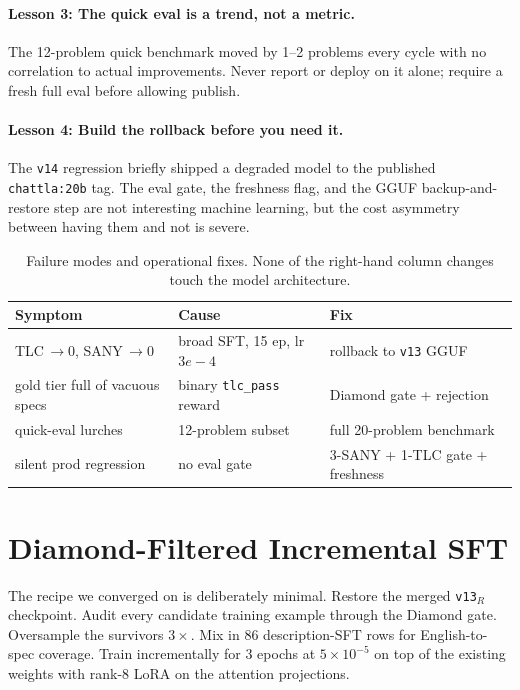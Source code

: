 \documentclass[11pt]{article}
\begin{document}
\paragraph{Lesson 3: The quick eval is a trend, not a metric.}
The 12-problem quick benchmark moved by 1--2 problems every cycle
with no correlation to actual improvements.  Never report or deploy on
it alone; require a fresh full eval before allowing publish.

\paragraph{Lesson 4: Build the rollback before you need it.}
The \texttt{v14} regression briefly shipped a degraded model to the
published \texttt{chattla:20b} tag.  The eval gate, the freshness flag,
and the GGUF backup-and-restore step are not interesting machine
learning, but the cost asymmetry between having them and not is severe.

\begin{table}[t]
\centering
\small
\begin{tabular}{@{}lll@{}}
\toprule
Symptom & Cause & Fix \\
\midrule
TLC$\,\to\!0$, SANY$\,\to\!0$ & broad SFT, 15 ep, lr $3e\!-\!4$
  & rollback to \texttt{v13} GGUF \\
gold tier full of vacuous specs & binary \texttt{tlc\_pass} reward
  & Diamond gate + rejection \\
quick-eval lurches & 12-problem subset
  & full 20-problem benchmark \\
silent prod regression & no eval gate
  & 3-SANY + 1-TLC gate + freshness \\
\bottomrule
\end{tabular}
\caption{Failure modes and operational fixes.  None of the right-hand
column changes touch the model architecture.}
\label{tab:lessons}
\end{table}

\section{Diamond-Filtered Incremental SFT}
\label{sec:diamond-sft}

The recipe we converged on is deliberately minimal.  Restore the merged
\texttt{v13}$_R$ checkpoint.  Audit every candidate training example
through the Diamond gate.  Oversample the survivors $3\times$.  Mix
in 86 description-SFT rows for English-to-spec coverage.  Train
incrementally for 3 epochs at $5\!\times\!10^{-5}$ on top of the
existing weights with rank-8 LoRA on the attention projections.
\end{document}
